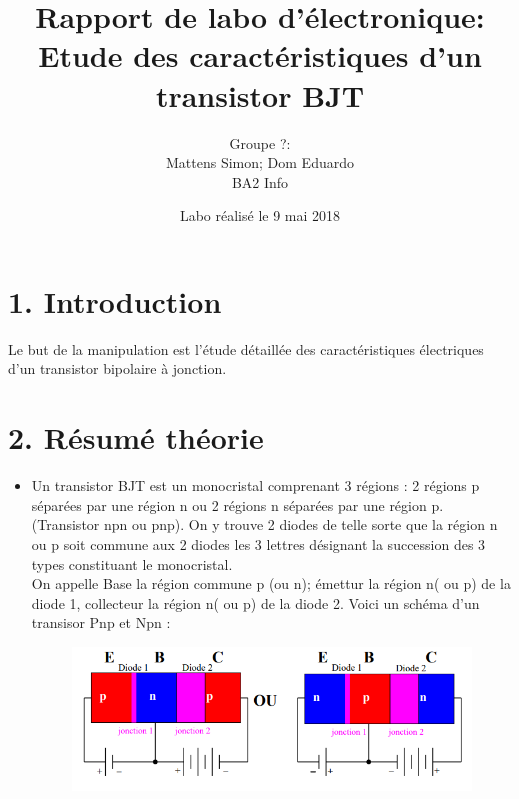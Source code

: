 \documentclass{report}
\title{Rapport de labo d'\'electronique: \\ Etude des caractéristiques d'un transistor BJT}
\author{Groupe ?: \\ Mattens Simon; Dom Eduardo \\ BA2 Info}
\date{Labo r\'ealis\'e le 9 mai 2018}
\begin{document}
\maketitle

\section*{1. Introduction}
Le but de la manipulation est l'étude détaillée des caractéristiques électriques d'un transistor bipolaire à jonction.

\section*{2. R\'esum\'e th\'eorie}
\begin{itemize}
\item Un transistor BJT est un monocristal comprenant 3 régions : 2 régions p séparées par une région n ou 2 régions n séparées par une région p. (Transistor npn ou pnp). On y trouve 2 diodes de telle sorte que la région n ou p soit commune aux 2 diodes les 3 lettres désignant la succession des 3 types constituant le monocristal.\\
On appelle Base la région commune p (ou n); émettur la région n( ou p) de la diode 1, collecteur la région n( ou p) de la diode 2. Voici un schéma d'un transisor Pnp et Npn :
\begin{figure}[h!]
\centering
\includegraphics[scale=0.5]{Trans.png}
\end{figure}


\end{itemize}
\end{document}
